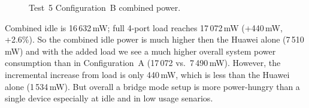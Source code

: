 \begin{figure}[H]
    \centering
    \caption{Test~5 Configuration~B combined power.}
    \label{fig:test5b_power}
\end{figure}

Combined idle is 16\,632\,mW; full 4-port load reaches 17\,072\,mW (+440\,mW, +2.6\%). So the combined idle power is much higher then the Huawei alone (7\,510\,mW) and with the added load we see a much higher overall system power consumption than in Configuration~A (17\,072 vs.\ 7\,490\,mW). However, the incremental increase from load is only 440\,mW, which is less than the Huawei alone (1\,534\,mW).
But overall a bridge mode setup is more power-hungry than a single device especially at idle and in low usage senarios.

